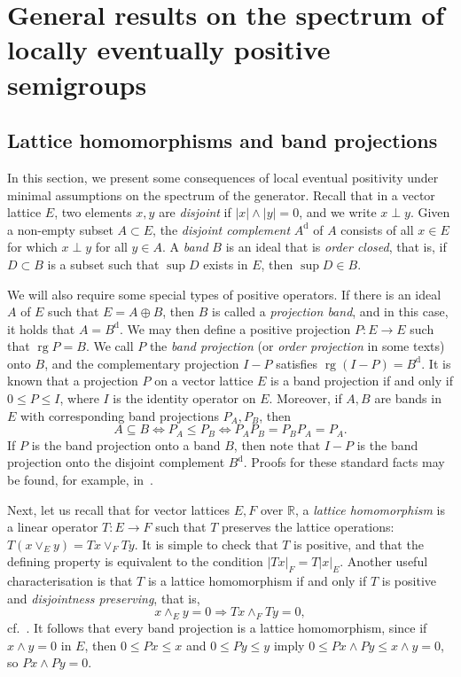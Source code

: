 \documentclass[a4paper, reqno]{amsart}
\numberwithin{equation}{section}
\theoremstyle{plain}
\theoremstyle{definition}
\theoremstyle{remark}
\DeclareMathOperator{\rg}{rg}
\newcommand{\RR}{\mathbb{R}}
\begin{document}
\section{General results on the spectrum of locally eventually positive semigroups}
\label{sec:abstract-stuff}

\subsection{Lattice homomorphisms and band projections}
In this section, we present some consequences of local eventual positivity under minimal assumptions on the spectrum of the generator. Recall that in a vector lattice $E$, two elements $x,y$ are \emph{disjoint} if $|x|\wedge |y|=0$, and we write $x \perp y$. Given a non-empty subset $A\subset E$, the \emph{disjoint complement} $A^{\mathrm{d}}$ of $A$ consists of all $x\in E$ for which $x\perp y$ for all $y\in A$. A \emph{band} $B$ is an ideal that is \emph{order closed}, that is, if $D\subset B$ is a subset such that $\sup D$ exists in $E$, then $\sup D \in B$.

We will also require some special types of positive operators. If there is an ideal $A$ of $E$ such that $E=A\oplus B$, then $B$ is called a \emph{projection band}, and in this case, it holds that $A=B^\mathrm{d}$. We may then define a positive projection $P : E\to E$ such that $\rg P = B$. We call $P$ the \emph{band projection} (or \emph{order projection} in some texts) onto $B$, and the complementary projection $I-P$ satisfies $\rg (I-P)=B^{\mathrm{d}}$. It is known that a projection $P$ on a vector lattice $E$ is a band projection if and only if $0 \le P \le I$, where $I$ is the identity operator on $E$. Moreover, if $A,B$ are bands in $E$ with corresponding band projections $P_A, P_B$, then
\begin{equation}
\label{eq:band-proj}
	A\subseteq B \iff P_A \le P_B \iff P_A P_B = P_B P_A = P_A.
\end{equation}
If $P$ is the band projection onto a band $B$, then note that $I-P$ is the band projection onto the disjoint complement $B^{\mathrm{d}}$. Proofs for these standard facts may be found, for example, in~\cite[Chapter 1, Section 3]{AB}.

Next, let us recall that for vector lattices $E,F$ over $\RR$, a \emph{lattice homomorphism} is a linear operator $T:E\to F$ such that $T$ preserves the lattice operations: $T(x\vee_E y) = Tx \vee_F Ty$. It is simple to check that $T$ is positive, and that the defining property is equivalent to the condition $|Tx|_F = T|x|_E$. Another useful characterisation is that $T$ is a lattice homomorphism if and only if $T$ is positive and \emph{disjointness preserving}, that is,
\begin{equation}
\label{eq:disjoint-preserve}
	x\wedge_E y = 0 \Rightarrow Tx \wedge_F Ty=0,
\end{equation}
cf.~\cite[Theorem 2.14]{AB}. It follows that every band projection is a lattice homomorphism, since if $x\wedge y=0$ in $E$, then $0\le Px \le x$ and $0\le Py \le y$ imply $0\le Px \wedge Py \le x\wedge y=0$, so $Px \wedge Py=0$.
\end{document}
